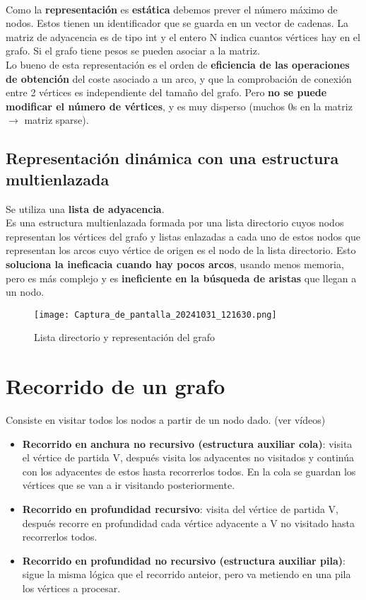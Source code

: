 \documentclass{article}
\begin{document}
\\

Como la \textbf{representación} es \textbf{estática} debemos prever el número máximo de nodos. Estos tienen un identificador que se guarda en un vector de cadenas. La matriz de adyacencia es de tipo int y el entero N indica cuantos vértices hay en el grafo. Si el grafo tiene pesos se pueden asociar a la matriz. \\
Lo bueno de esta representación es el orden de \textbf{eficiencia de las operaciones de obtención} del coste asociado a un arco, y que la comprobación de conexión entre 2 vértices es independiente del tamaño del grafo. Pero \textbf{no se puede modificar el número de vértices}, y es muy disperso (muchos 0s en la matriz $\rightarrow$ matriz sparse). 

\subsection{Representación dinámica con una estructura multienlazada}
Se utiliza una \textbf{lista de adyacencia}. \\
Es una estructura multienlazada formada por una lista directorio cuyos nodos representan los vértices del grafo y listas enlazadas a cada uno de estos nodos que representan los arcos cuyo vértice de origen es el nodo de la lista directorio. Esto \textbf{soluciona la ineficacia cuando hay pocos arcos}, usando menos memoria,  pero es más complejo y es \textbf{ineficiente en la búsqueda de aristas} que llegan a un nodo.\\

\begin{figure}[h]
    \centering
    \texttt{[image: Captura\_de\_pantalla\_20241031\_121630.png]}
    \caption{Lista directorio y representación del grafo}
    \label{fig:etiqueta}
\end{figure}

\section{Recorrido de un grafo}
Consiste en visitar todos los nodos a partir de un nodo dado. (ver vídeos)\\
\begin{itemize}
    \item \textbf{Recorrido en anchura no recursivo (estructura auxiliar cola)}: visita el vértice de partida V, después visita los adyacentes no visitados y continúa con los adyacentes de estos hasta recorrerlos todos. En la cola se guardan los vértices que se van a ir visitando posteriormente.

    \item \textbf{Recorrido en profundidad recursivo}: visita del vértice de partida V, después recorre en profundidad cada vértice adyacente a V no visitado hasta recorrerlos todos.

    \item \textbf{Recorrido en profundidad no recursivo (estructura auxiliar pila)}: sigue la misma lógica que el recorrido anteior, pero va metiendo en una pila los vértices a procesar.

\end{itemize}
\end{document}
